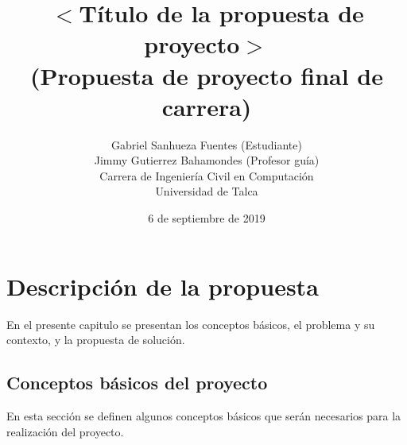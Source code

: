 \documentclass[11pt,letterpaper]{article}
\begin{document}
\pagestyle{empty}

\title{
$<$Título de la propuesta de proyecto$>$\\
(Propuesta de proyecto final de carrera)
}
\author{
Gabriel Sanhueza Fuentes (Estudiante)\\
Jimmy Gutierrez Bahamondes (Profesor guía)\\
Carrera de Ingeniería Civil en Computación\\ 
Universidad de Talca}
\date{6 de septiembre de 2019}

\maketitle


\section{Descripción de la propuesta}


En el presente capitulo se presentan los conceptos básicos, el problema y su contexto, y la propuesta de solución. 

\subsection{Conceptos básicos del proyecto} 

En esta sección se definen algunos conceptos básicos que serán necesarios para la realización del proyecto.
\end{document}

